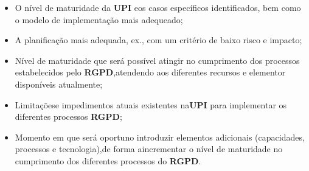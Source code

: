 \begin{itemize}
	\item O nível de maturidade da \textbf{UPI} eos casos específicos identificados, bem como o modelo de implementação mais adequeado;
	\item A planificação mais adequada, ex., com um critério de baixo risco e impacto;
	\item Nível de maturidade que será possível atingir no cumprimento dos processos estabelecidos pelo \textbf{RGPD},atendendo aos diferentes recursos e elementor disponíveis atualmente;
	\item Limitaçõese impedimentos atuais existentes na\textbf{UPI} para implementar os diferentes processos \textbf{RGPD};
	\item Momento em que será oportuno introduzir elementos adicionais (capacidades, processos e tecnologia),de forma aincrementar o nível de maturidade no cumprimento dos diferentes processos do \textbf{RGPD}.
\end{itemize}